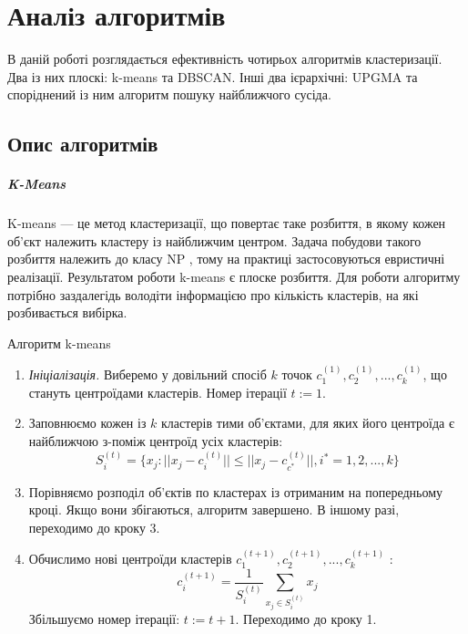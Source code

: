 \chapter {Аналіз алгоритмів}

    В даній роботі розглядається ефективність чотирьох алгоритмів кластеризації. Два із них плоскі: k-means та DBSCAN. Інші два ієрархічні: UPGMA та споріднений із ним алгоритм пошуку найближчого сусіда.

    \section {Опис алгоритмів}
        \paragraph {K-Means}
            K-means --- це метод кластеризації, що повертає таке розбиття, в якому кожен об'єкт належить кластеру із найближчим центром. Задача побудови такого розбиття належить до класу NP \cite{KmeansNpHard}, тому на практиці застосовуються евристичні реалізації.
            Результатом роботи k-means є плоске розбиття. Для роботи алгоритму потрібно заздалегідь володіти інформацією про кількість кластерів, на які розбивається вибірка.
            \begin{algorithm}
                \caption {Алгоритм k-means}
                \begin{enumerate}
                    \item[ ] \emph {Ініціалізація.}
                        Виберемо у довільний спосіб $k$ точок $c_1^{(1)}, c_2^{(1)}, ..., c_k^{(1)}$, що стануть центроїдами кластерів. Номер ітерації $t := 1$.
                    \item
                        Заповнюємо кожен із $k$ кластерів тими об'єктами, для яких його центроїда є найближчою з-поміж центроїд усіх кластерів:
                        \[
                            S_i^{(t)} = \{x_j : ||x_j - c_i^{(t)}|| \leq ||x_j - c_{c^*}^{(t)}||, 
                            i^* = 1, 2, ..., k\}
                        \]
                    \item
                        Порівняємо розподіл об'єктів по кластерах із отриманим на попередньому кроці.
                        Якщо вони збігаються, алгоритм завершено. В іншому разі, переходимо до кроку 3.
                    \item
                        Обчислимо нові центроїди кластерів $c_1^{(t+1)}, c_2^{(t+1)}, ..., c_k^{(t+1)}$ :
                        \[
                            c_i^{(t+1)} = \frac{1} {S_i^{(t)}} \sum_{x_j \in S_i^{(t)}} x_j
                        \]
                        Збільшуємо номер ітерації: $t := t + 1$.
                        Переходимо до кроку 1.                        
                \end{enumerate}
            \end{algorithm}
            
